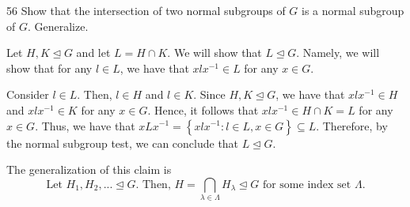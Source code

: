 \begin{hwproblem}
{56}{
    Show that the intersection of two normal subgroups of $G$ is a normal subgroup of $G$. Generalize.
}

Let \(H, K \unlhd G\) and let \(L = H \cap K\). We will show that \(L \unlhd G\). Namely, we will show that for any \(l \in L\), we have that \(xlx^{-1} \in L\) for any \(x \in G\).

Consider \(l \in L\). Then, \(l \in H\) and \(l \in K\). Since \(H, K \unlhd G\), we have that \(xlx^{-1} \in H\) and \(xlx^{-1} \in K\) for any \(x \in G\). Hence, it follows that \(xlx^{-1} \in H \cap K = L\) for any \(x \in G\). Thus, we have that \(xLx^{-1} = \left\{xlx^{-1} : l \in L, x \in G\right\} \subseteq L\). Therefore, by the normal subgroup test, we can conclude that \(L \unlhd G\).

The generalization of this claim is
\[
    \text{Let \(H_1, H_2, ... \unlhd G\). Then, 
    \(H = \bigcap_{\lambda \in \Lambda} H_\lambda \unlhd G\) for some index set \(\Lambda\).}
\]
\end{hwproblem}

